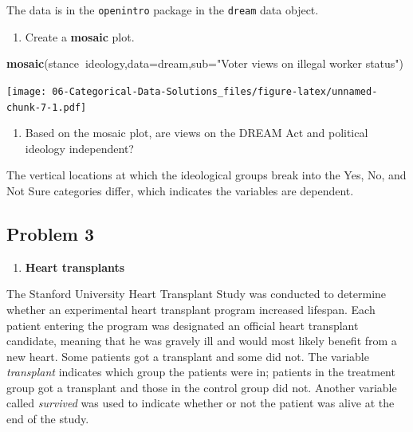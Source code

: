 \documentclass[
]{book}
\newenvironment{Shaded}{\begin{snugshade}}{\end{snugshade}}
\newcommand{\DataTypeTok}[1]{\textcolor[rgb]{0.13,0.29,0.53}{#1}}
\newcommand{\KeywordTok}[1]{\textcolor[rgb]{0.13,0.29,0.53}{\textbf{#1}}}
\newcommand{\NormalTok}[1]{#1}
\newcommand{\OperatorTok}[1]{\textcolor[rgb]{0.81,0.36,0.00}{\textbf{#1}}}
\newcommand{\StringTok}[1]{\textcolor[rgb]{0.31,0.60,0.02}{#1}}
\providecommand{\tightlist}{%
  \setlength{\itemsep}{0pt}\setlength{\parskip}{0pt}}
\begin{document}
The data is in the \texttt{openintro} package in the \texttt{dream} data object.

\begin{enumerate}
\def\labelenumi{\alph{enumi}.}
\tightlist
\item
  Create a \textbf{mosaic} plot.
\end{enumerate}

\begin{Shaded}
\begin{Highlighting}[]
\KeywordTok{mosaic}\NormalTok{(stance}\OperatorTok{~}\NormalTok{ideology,}\DataTypeTok{data=}\NormalTok{dream,}\DataTypeTok{sub=}\StringTok{"Voter views on illegal worker status"}\NormalTok{)}
\end{Highlighting}
\end{Shaded}

\texttt{[image: 06-Categorical-Data-Solutions\_files/figure-latex/unnamed-chunk-7-1.pdf]}

\begin{enumerate}
\def\labelenumi{\alph{enumi}.}
\setcounter{enumi}{1}
\tightlist
\item
  Based on the mosaic plot, are views on the DREAM Act and political ideology independent?
\end{enumerate}

The vertical locations at which the ideological groups break into the Yes, No, and Not Sure categories differ, which indicates the variables are dependent.

\pagebreak

\hypertarget{problem-3-3}{%
\subsection{Problem 3}\label{problem-3-3}}

\begin{enumerate}
\def\labelenumi{\arabic{enumi}.}
\setcounter{enumi}{2}
\tightlist
\item
  \textbf{Heart transplants}
\end{enumerate}

The Stanford University Heart Transplant Study was conducted to determine whether an experimental heart transplant program increased lifespan. Each patient entering the program was designated an official heart transplant candidate, meaning that he was gravely ill and would most likely benefit from a new heart. Some patients got a transplant and some did not. The variable \emph{transplant} indicates which group the patients were in; patients in the treatment group got a transplant and those in the control group did not. Another variable called \emph{survived} was used to indicate whether or not the patient was alive at the end of the study.
\end{document}
